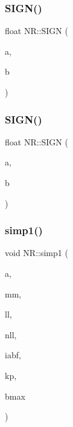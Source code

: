\subsubsection{\texorpdfstring{SIGN()}{SIGN()}\hspace{0.1cm}{\footnotesize\ttfamily [2/3]}}
{\footnotesize\ttfamily float N\+R\+::\+S\+I\+GN (\begin{DoxyParamCaption}\item[{const float \&}]{a,  }\item[{const double \&}]{b }\end{DoxyParamCaption})\hspace{0.3cm}{\ttfamily [inline]}}

\mbox{\label{namespaceNR_a440c19c5d53c74535be8d59bc5b52a9f}} 
\subsubsection{\texorpdfstring{SIGN()}{SIGN()}\hspace{0.1cm}{\footnotesize\ttfamily [3/3]}}
{\footnotesize\ttfamily float N\+R\+::\+S\+I\+GN (\begin{DoxyParamCaption}\item[{const double \&}]{a,  }\item[{const float \&}]{b }\end{DoxyParamCaption})\hspace{0.3cm}{\ttfamily [inline]}}

\mbox{\label{namespaceNR_aabcc7bcebb2a9ffcefb8231216a3b2bf}} 
\subsubsection{\texorpdfstring{simp1()}{simp1()}}
{\footnotesize\ttfamily void N\+R\+::simp1 (\begin{DoxyParamCaption}\item[{\mbox{\hyperlink{namespaceNR_a2b8abfda8fffad6ba0a1b5a4c0773dbf}{Mat\+\_\+\+I\+\_\+\+DP}} \&}]{a,  }\item[{const int}]{mm,  }\item[{\mbox{\hyperlink{namespaceNR_ae67ce7dc86a8a64a7ce73c3c030ff610}{Vec\+\_\+\+I\+\_\+\+I\+NT}} \&}]{ll,  }\item[{const int}]{nll,  }\item[{const int}]{iabf,  }\item[{int \&}]{kp,  }\item[{\mbox{\hyperlink{namespaceNR_af6ff762dd605ff477b8e52387253a02a}{DP}} \&}]{bmax }\end{DoxyParamCaption})}

